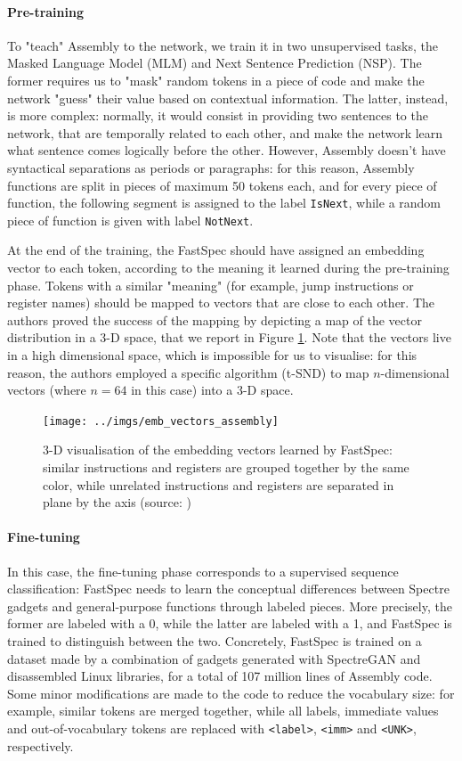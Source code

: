 \documentclass[12pt,a4paper]{book}
\theoremstyle{definition}
\begin{document}
	\paragraph{Pre-training} To "teach" Assembly to the network, we train it in two unsupervised tasks, the Masked Language Model (MLM) and Next Sentence Prediction (NSP). The former requires us to "mask" random tokens in a piece of code and make the network "guess" their value based on contextual information. The latter, instead, is more complex: normally, it would consist in providing two sentences to the network, that are temporally related to each other, and make the network learn what sentence comes logically before the other. However, Assembly doesn't have syntactical separations as periods or paragraphs: for this reason, Assembly functions are split in pieces of maximum 50 tokens each, and for every piece of function, the following segment is assigned to the label \texttt{IsNext}, while a random piece of function is given with label \texttt{NotNext}.
	
	At the end of the training, the FastSpec should have assigned an embedding vector to each token, according to the meaning it learned during the pre-training phase. Tokens with a similar "meaning" (for example, jump instructions or register names) should be mapped to vectors that are close to each other. The authors proved the success of the mapping by depicting a map of the vector distribution in a 3-D space, that we report in Figure \ref{fig:emb_vec}. Note that the vectors live in a high dimensional space, which is impossible for us to visualise: for this reason, the authors employed a specific algorithm (t-SND) to map $n$-dimensional vectors (where $n = 64$ in this case) into a 3-D space.
	 
	\begin{figure}[!h] 
		\centering
		\texttt{[image: ../imgs/emb\_vectors\_assembly]}
		\captionsetup{width=.7\linewidth}
		\caption{3-D visualisation of the embedding vectors learned by FastSpec: similar instructions and registers are grouped together by the same color, while unrelated instructions and registers are separated in plane by the axis (source: \cite{Tol2021})}
		\label{fig:emb_vec}
	\end{figure}
	
	\paragraph{Fine-tuning} In this case, the fine-tuning phase corresponds to a supervised sequence classification: FastSpec needs to learn the conceptual differences between Spectre gadgets and general-purpose functions through labeled pieces. More precisely, the former are labeled with a 0, while the latter are labeled with a 1, and FastSpec is trained to distinguish between the two. Concretely, FastSpec is trained on a dataset made by a combination of gadgets generated with SpectreGAN and disassembled Linux libraries, for a total of 107 million lines of Assembly code. Some minor modifications are made to the code to reduce the vocabulary size: for example, similar tokens are merged together, while all labels, immediate values and out-of-vocabulary tokens are replaced with \texttt{<label>}, \texttt{<imm>} and \texttt{<UNK>}, respectively.
	
\end{document}
